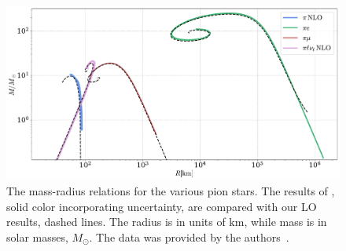 \begin{figure}[p]
    \centering
    \includegraphics[width=.85\textwidth]{../scripts/figurer/pion_star/mass_radius_brandt_all.pdf}
    \caption{
        The mass-radius relations for the various pion stars.
        The results of \citeauthor{brandtNewClassCompact2018}, solid color incorporating uncertainty, are compared with our LO results, dashed lines.
        The radius is in units of $\text{km}$, while mass is in solar masses, $M_\odot$.
        The data was provided by the authors~\autocite{brandtNewClassCompact2018}.
    }
    \label{fig: brandt mass-radius}
\end{figure}


